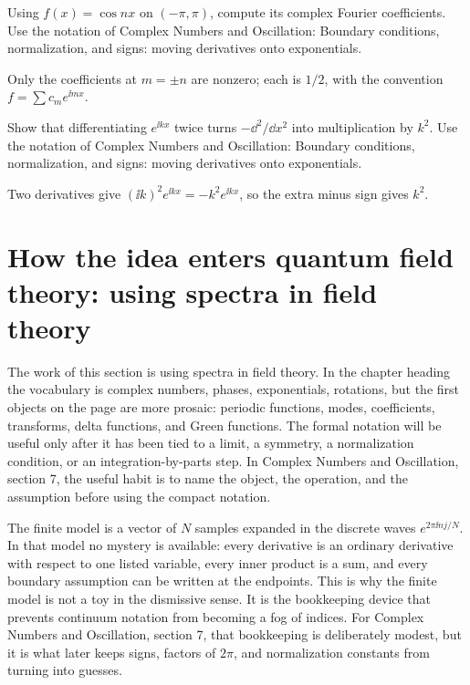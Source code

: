\begin{exercise}
Using \(f(x)=\cos nx\) on \((-\pi,\pi)\), compute its complex Fourier coefficients.  Use the notation of Complex Numbers and Oscillation: Boundary conditions, normalization, and signs: moving derivatives onto exponentials.
\begin{answer}
Only the coefficients at \(m=\pm n\) are nonzero; each is \(1/2\), with the convention \(f=\sum c_me^{\ii mx}\).
\end{answer}
\end{exercise}

\begin{exercise}
Show that differentiating \(e^{\ii kx}\) twice turns \(-\dd^2/\dd x^2\) into multiplication by \(k^2\).  Use the notation of Complex Numbers and Oscillation: Boundary conditions, normalization, and signs: moving derivatives onto exponentials.
\begin{answer}
Two derivatives give \((\ii k)^2e^{\ii kx}=-k^2e^{\ii kx}\), so the extra minus sign gives \(k^2\).
\end{answer}
\end{exercise}



\section{How the idea enters quantum field theory: using spectra in field theory}

The work of this section is using spectra in field theory.  In the chapter heading the vocabulary is complex numbers, phases, exponentials, rotations, but the first objects on the page are more prosaic: periodic functions, modes, coefficients, transforms, delta functions, and Green functions.  The formal notation will be useful only after it has been tied to a limit, a symmetry, a normalization condition, or an integration-by-parts step.  In Complex Numbers and Oscillation, section 7, the useful habit is to name the object, the operation, and the assumption before using the compact notation.

The finite model is a vector of \(N\) samples expanded in the discrete waves \(e^{2\pi \ii nj/N}\).  In that model no mystery is available: every derivative is an ordinary derivative with respect to one listed variable, every inner product is a sum, and every boundary assumption can be written at the endpoints.  This is why the finite model is not a toy in the dismissive sense.  It is the bookkeeping device that prevents continuum notation from becoming a fog of indices.  For Complex Numbers and Oscillation, section 7, that bookkeeping is deliberately modest, but it is what later keeps signs, factors of \(2\pi\), and normalization constants from turning into guesses.

